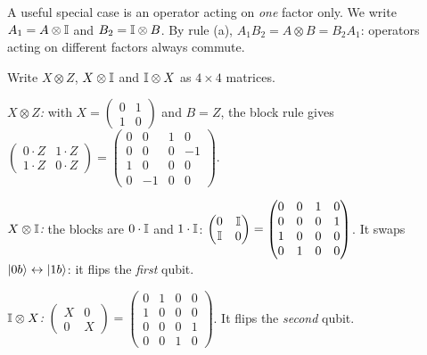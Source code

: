 A useful special case is an operator acting on \emph{one} factor only. We write $A_1=A\otimes\mathbb{I}$ and $B_2=\mathbb{I}\otimes B$. By rule (a), $A_1B_2=A\otimes B=B_2A_1$: operators acting on different factors always commute.

\begin{example}\label{ex:kron}
  Write $X\otimes Z$, $X\otimes\mathbb{I}$ and $\mathbb{I}\otimes X$ as $4\times4$ matrices.
\end{example}
\begin{solution}
  \begin{steps}
    \item \emph{$X\otimes Z$:} with $X=\begin{pmatrix}0&1\\1&0\end{pmatrix}$ and $B=Z$, the block rule gives $\begin{pmatrix}0\cdot Z&1\cdot Z\\1\cdot Z&0\cdot Z\end{pmatrix}=\begin{pmatrix}0&0&1&0\\0&0&0&-1\\1&0&0&0\\0&-1&0&0\end{pmatrix}$.
    \item \emph{$X\otimes\mathbb{I}$:} the blocks are $0\cdot\mathbb{I}$ and $1\cdot\mathbb{I}$: $\begin{pmatrix}0&\mathbb{I}\\\mathbb{I}&0\end{pmatrix}=\begin{pmatrix}0&0&1&0\\0&0&0&1\\1&0&0&0\\0&1&0&0\end{pmatrix}$. It swaps $\left|0b\right\rangle\leftrightarrow\left|1b\right\rangle$: it flips the \emph{first} qubit.
    \item \emph{$\mathbb{I}\otimes X$:} $\begin{pmatrix}X&0\\0&X\end{pmatrix}=\begin{pmatrix}0&1&0&0\\1&0&0&0\\0&0&0&1\\0&0&1&0\end{pmatrix}$. It flips the \emph{second} qubit.
  \end{steps}
\end{solution}

